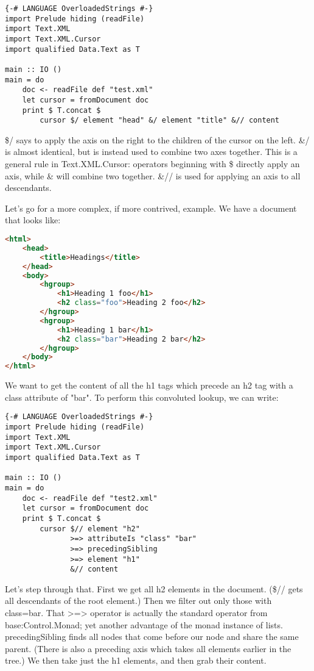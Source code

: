 \begin{lstlisting}
{-# LANGUAGE OverloadedStrings #-}
import Prelude hiding (readFile)
import Text.XML
import Text.XML.Cursor
import qualified Data.Text as T

main :: IO ()
main = do
    doc <- readFile def "test.xml"
    let cursor = fromDocument doc
    print $ T.concat $
        cursor $/ element "head" &/ element "title" &// content
\end{lstlisting}%

\$/ says to apply the axis on the right to the children of the cursor on the left. \&/ is almost identical, but is instead used to combine two axes together. This is a general rule in Text.XML.Cursor: operators beginning with \$ directly apply an axis, while \& will combine two together. \&// is used for applying an axis to all descendants.

Let's go for a more complex, if more contrived, example. We have a document that looks like:

\begin{lstlisting}[language=HTML]
  <html>
    <head>
        <title>Headings</title>
    </head>
    <body>
        <hgroup>
            <h1>Heading 1 foo</h1>
            <h2 class="foo">Heading 2 foo</h2>
        </hgroup>
        <hgroup>
            <h1>Heading 1 bar</h1>
            <h2 class="bar">Heading 2 bar</h2>
        </hgroup>
    </body>
</html>
\end{lstlisting}

We want to get the content of all the h1 tags which precede an h2 tag with a class attribute of "bar". To perform this convoluted lookup, we can write:

\begin{lstlisting}
{-# LANGUAGE OverloadedStrings #-}
import Prelude hiding (readFile)
import Text.XML
import Text.XML.Cursor
import qualified Data.Text as T

main :: IO ()
main = do
    doc <- readFile def "test2.xml"
    let cursor = fromDocument doc
    print $ T.concat $
        cursor $// element "h2"
               >=> attributeIs "class" "bar"
               >=> precedingSibling
               >=> element "h1"
               &// content
\end{lstlisting}%

Let's step through that. First we get all h2 elements in the document. (\$// gets all descendants of the root element.) Then we filter out only those with class=bar. That >=> operator is actually the standard operator from base:Control.Monad; yet another advantage of the monad instance of lists. precedingSibling finds all nodes that come before our node and share the same parent. (There is also a preceding axis which takes all elements earlier in the tree.) We then take just the h1 elements, and then grab their content.

